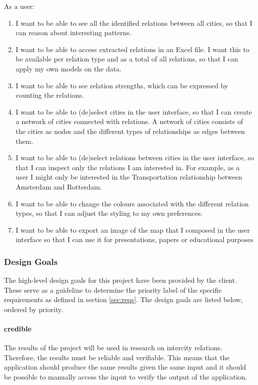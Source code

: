 As a user:
\begin{enumerate}
    \item I want to be able to see all the identified relations between all cities, so that I can reason about interesting patterns.
    \item I want to be able to access extracted relations in an Excel file. I want this to be available per relation type and as a total of all relations, so that I can apply my own models on the data.
    \item I want to be able to see relation strengths, which can be expressed by counting the relations.
    \item I want to be able to (de)select cities in the user interface, so that I can create a network of cities connected with relations. A network of cities consists of the cities as nodes and the different types of relationships as edges between them.
    \item I want to be able to (de)select relations between cities in the user interface, so that I can inspect only the relations I am interested in. For example, as a user I might only be interested in the Transportation relationship between Amsterdam and Rotterdam.
    \item I want to be able to change the colours associated with the different relation types, so that I can adjust the styling to my own preferences.
    \item I want to be able to export an image of the map that I composed in the user interface so that I can use it for presentations, papers or educational purposes
\end{enumerate}

\subsubsection{Design Goals} \label{sec:design-goals}
The high-level design goals for this project have been provided by the client. These serve as a guideline to determine the priority label of the specific requirements as defined in section \ref{sec:reqs}. The design goals are listed below, ordered by priority.

\paragraph{credible} The results of the project will be used in research on intercity relations. Therefore, the results must be reliable and verifiable. This means that the application should produce the same results given the same input and it should be possible to manually access the input to verify the output of the application.
